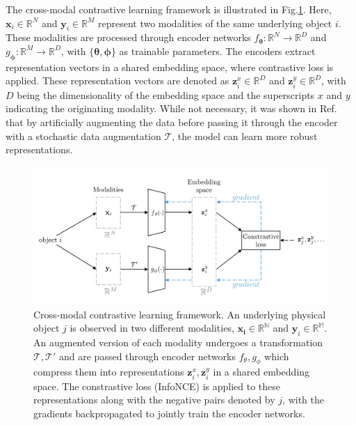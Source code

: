 \documentclass[draft, a4paper,12pt]{article}
\begin{document}
The cross-modal contrastive learning framework is illustrated in Fig.\ref{fig:contrastive_learning}. Here, $\mathbf{x}_i \in \mathbb{R}^N$ and $\mathbf{y}_i \in \mathbb{R}^M$ represent two modalities of the same underlying object $i$. These modalities are processed through encoder networks $f_{\mathbf{\theta}}: \mathbb{R}^N \rightarrow \mathbb{R}^D$ and $g_{\mathbf{\phi}}: \mathbb{R}^M \rightarrow \mathbb{R}^D$, with $\{\mathbf{\theta}, \mathbf{\phi}\}$ as trainable parameters. The encoders extract representation vectors in a shared embedding space, where contrastive loss is applied. These representation vectors are denoted as $\mathbf{z}^x_i \in \mathbb{R}^D$ and $\mathbf{z}^y_i \in \mathbb{R}^D$, with $D$ being the dimensionality of the embedding space and the superscripts $x$ and $y$ indicating the originating modality. While not necessary, it was shown in Ref.\cite{crossCLIP} that by artificially augmenting the data before passing it through the encoder with a stochastic data augmentation $\mathcal{T}$, the model can learn more robust representations.

\begin{figure}[H]
    \centering
    \includegraphics[width=\textwidth]{../figures/diagram_contrastive_learning.pdf}
    \caption{Cross-modal contrastive learning framework. An underlying physical object $j$ is observed in two different modalities, $\mathbf{x_i}\in \mathbb{R^N}$ and $\mathbf{y}_i \in \mathbb{R^M}$. An augmented version of each modality undergoes a transformation $\mathcal{T}, \mathcal{T}'$ and are passed through encoder networks $f_{\theta}, g_{\phi}$ which compress them into representations $\mathbf{z}^x_i, \mathbf{z}^y_i$ in a shared embedding space. The constrastive loss (InfoNCE) is applied to these representations along with the negative pairs denoted by $j$, with the gradients backpropagated to jointly train the encoder networks.}
    \label{fig:contrastive_learning}
\end{figure}
\end{document}
